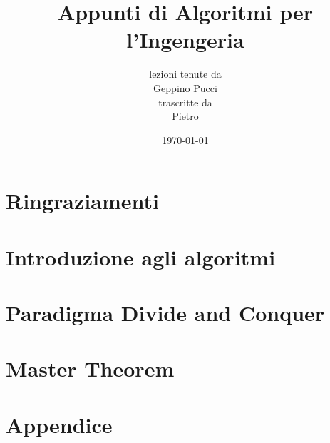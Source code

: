 \documentclass[a4paper,oneside]{book}
\title{Appunti di Algoritmi per l'Ingengeria}
\author{lezioni tenute da\\ Geppino Pucci \\ trascritte da \\ Pietro}
\date{\today}
\theoremstyle{definition}
\theoremstyle{theorem}
\begin{document}
\pagestyle{plain}

% 
\maketitle

\cleardoublepage

\frontmatter %

\chapter*{Ringraziamenti}



\tableofcontents

\mainmatter

\pagestyle{fancy}


\chapter{Introduzione agli algoritmi}


\chapter{Paradigma Divide and Conquer}


\chapter{Master Theorem}




\cleardoublepage

\appendix
{}

\chapter{Appendice}

\end{document}
